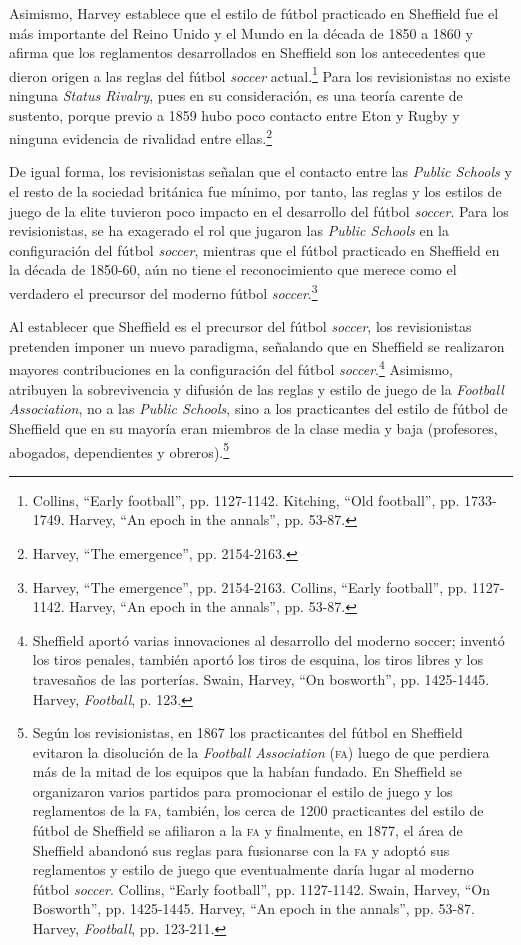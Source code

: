 \documentclass[11pt,a5paper,twoside]{book} %
\begin{document}
Asimismo, Harvey establece que el estilo de fútbol practicado en Sheffield fue el más
importante del Reino Unido y el Mundo en la década de 1850 a 1860 y afirma que los
reglamentos desarrollados en Sheffield son los antecedentes que dieron origen a las reglas
del fútbol \emph{soccer} actual.\footnote{Collins, ``Early football'', pp. 1127-1142. Kitching, ``Old football'', pp. 1733-1749. Harvey, ``An epoch in the annals'', pp. 53-87.} Para los revisionistas no existe ninguna \emph{Status Rivalry}, pues en su consideración, es una teoría carente de sustento, porque previo a 1859 hubo poco contacto entre Eton y Rugby y ninguna evidencia de rivalidad entre ellas.\footnote{Harvey, ``The emergence'', pp. 2154-2163.}

De igual forma, los revisionistas señalan que el contacto entre las \emph{Public Schools} y el
resto de la sociedad británica fue mínimo, por tanto, las reglas y los estilos de juego de la
elite tuvieron poco impacto en el desarrollo del fútbol \emph{soccer}. Para los revisionistas, se ha
exagerado el rol que jugaron las \emph{Public Schools} en la configuración del fútbol \emph{soccer},
mientras que el fútbol practicado en Sheffield en la década de 1850-60, aún no tiene el
reconocimiento que merece como el verdadero el precursor del moderno fútbol \emph{soccer}.\footnote{Harvey, ``The emergence'', pp. 2154-2163. Collins, ``Early football'', pp. 1127-1142. Harvey, ``An epoch in the annals'', pp. 53-87.}

Al establecer que Sheffield es el precursor del fútbol \emph{soccer}, los revisionistas
pretenden imponer un nuevo paradigma, señalando que en Sheffield se realizaron mayores
contribuciones en la configuración del fútbol \emph{soccer}.\footnote{Sheffield aportó varias innovaciones al desarrollo del moderno soccer; inventó los tiros penales, también aportó los tiros de esquina, los tiros libres y los travesaños de las porterías. Swain, Harvey, ``On bosworth'', pp. 1425-1445. Harvey, \emph{Football}, p. 123.} Asimismo, atribuyen la sobrevivencia y difusión de las reglas y estilo de juego de la \emph{Football Association}, no a las \emph{Public Schools}, sino a los practicantes del estilo de fútbol de Sheffield que en su mayoría eran miembros de
la clase media y baja (profesores, abogados, dependientes y obreros).\footnote{Según los revisionistas, en 1867 los practicantes del fútbol en Sheffield evitaron la disolución de la \emph{Football Association} (\textsc{fa}) luego de que perdiera más de la mitad de los equipos que la habían fundado. En Sheffield se organizaron varios partidos para promocionar el estilo de juego y los reglamentos de la \textsc{fa}, también, los cerca de 1200 practicantes del estilo de fútbol de Sheffield se afiliaron a la \textsc{fa} y finalmente, en 1877, el área de Sheffield abandonó sus reglas para fusionarse con la \textsc{fa} y adoptó sus reglamentos y estilo de juego que eventualmente daría lugar al moderno fútbol \emph{soccer}. Collins, ``Early football'', pp. 1127-1142. Swain, Harvey, ``On Bosworth'', pp. 1425-1445. Harvey, ``An epoch in the annals'', pp. 53-87. Harvey, \emph{Football}, pp. 123-211.}
\end{document}
